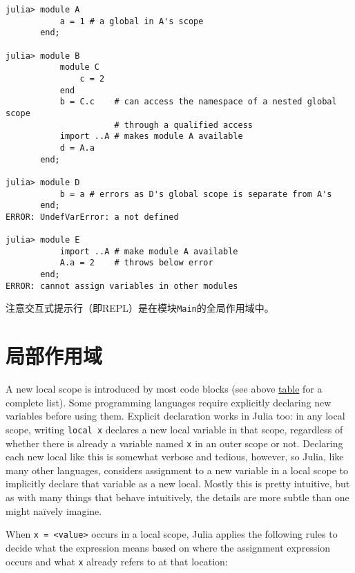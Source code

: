 \begin{verbatim}
julia> module A
           a = 1 # a global in A's scope
       end;

julia> module B
           module C
               c = 2
           end
           b = C.c    # can access the namespace of a nested global scope
                      # through a qualified access
           import ..A # makes module A available
           d = A.a
       end;

julia> module D
           b = a # errors as D's global scope is separate from A's
       end;
ERROR: UndefVarError: a not defined

julia> module E
           import ..A # make module A available
           A.a = 2    # throws below error
       end;
ERROR: cannot assign variables in other modules
\end{verbatim}



注意交互式提示行（即REPL）是在模块\texttt{Main}的全局作用域中。



\hypertarget{8604224695833880734}{}


\section{局部作用域}



A new local scope is introduced by most code blocks (see above \hyperlink{8072811582823893323}{table} for a complete list). Some programming languages require explicitly declaring new variables before using them. Explicit declaration works in Julia too: in any local scope, writing \texttt{local x} declares a new local variable in that scope, regardless of whether there is already a variable named \texttt{x} in an outer scope or not. Declaring each new local like this is somewhat verbose and tedious, however, so Julia, like many other languages, considers assignment to a new variable in a local scope to implicitly declare that variable as a new local. Mostly this is pretty intuitive, but as with many things that behave intuitively, the details are more subtle than one might naïvely imagine.



When \texttt{x = <value>} occurs in a local scope, Julia applies the following rules to decide what the expression means based on where the assignment expression occurs and what \texttt{x} already refers to at that location:



